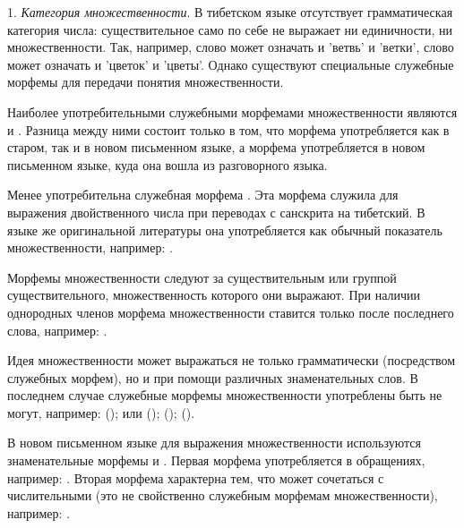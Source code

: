1. \emph{Категория множественности}. В тибетском языке отсутствует грамматическая категория числа: существительное само по себе не выражает ни единичности, ни множественности. Так, например,
слово  может означать и 'ветвь' и 'ветки',
слово  может означать и 'цветок' и 'цветы'. Однако существуют специальные служебные морфемы для передачи понятия множественности.

Наиболее употребительными служебными морфемами множественности являются	 и . Разница между ними состоит только в том, что морфема  употребляется как в старом, так и в новом письменном языке, а морфема  употребляется в новом письменном языке, куда она вошла из разговорного языка.

Менее употребительна служебная морфема .
Эта морфема служила для выражения двойственного числа при переводах с санскрита на тибетский. В языке же оригинальной литературы она употребляется как обычный показатель множественности, например: .

Морфемы множественности следуют за существительным или группой существительного, множественность которого они выражают. При наличии однородных членов морфема множественности ставится только после последнего слова, например: .

Идея множественности может выражаться не только грамматически (посредством служебных морфем), но и при помощи различных знаменательных слов. В последнем случае служебные морфемы множественности употреблены быть не могут, например:
 ();
 или  ();
 ();
 ().

В новом письменном языке для выражения множественности используются знаменательные морфемы  и .
Первая морфема употребляется в обращениях, например: . Вторая морфема характерна тем, что может сочетаться с числительными (это не свойственно служебным морфемам множественности), например:
.

